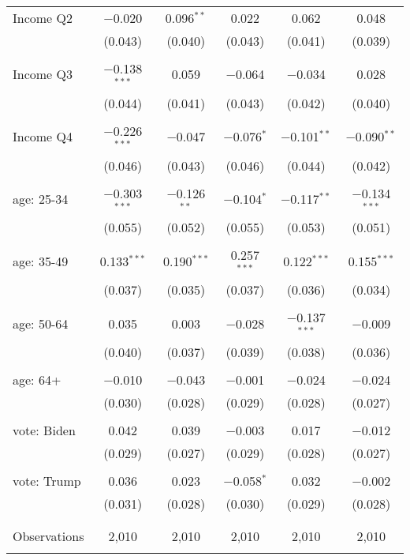 \begin{tabular}{@{\extracolsep{5pt}}lccccc}
 Income Q2 & $-$0.020 & 0.096$^{**}$ & 0.022 & 0.062 & 0.048 \\ 
  & (0.043) & (0.040) & (0.043) & (0.041) & (0.039) \\ 
  & & & & & \\ 
 Income Q3 & $-$0.138$^{***}$ & 0.059 & $-$0.064 & $-$0.034 & 0.028 \\ 
  & (0.044) & (0.041) & (0.043) & (0.042) & (0.040) \\ 
  & & & & & \\ 
 Income Q4 & $-$0.226$^{***}$ & $-$0.047 & $-$0.076$^{*}$ & $-$0.101$^{**}$ & $-$0.090$^{**}$ \\ 
  & (0.046) & (0.043) & (0.046) & (0.044) & (0.042) \\ 
  & & & & & \\ 
 age: 25-34 & $-$0.303$^{***}$ & $-$0.126$^{**}$ & $-$0.104$^{*}$ & $-$0.117$^{**}$ & $-$0.134$^{***}$ \\ 
  & (0.055) & (0.052) & (0.055) & (0.053) & (0.051) \\ 
  & & & & & \\ 
 age: 35-49 & 0.133$^{***}$ & 0.190$^{***}$ & 0.257$^{***}$ & 0.122$^{***}$ & 0.155$^{***}$ \\ 
  & (0.037) & (0.035) & (0.037) & (0.036) & (0.034) \\ 
  & & & & & \\ 
 age: 50-64 & 0.035 & 0.003 & $-$0.028 & $-$0.137$^{***}$ & $-$0.009 \\ 
  & (0.040) & (0.037) & (0.039) & (0.038) & (0.036) \\ 
  & & & & & \\ 
 age: 64+ & $-$0.010 & $-$0.043 & $-$0.001 & $-$0.024 & $-$0.024 \\ 
  & (0.030) & (0.028) & (0.029) & (0.028) & (0.027) \\ 
  & & & & & \\ 
 vote: Biden & 0.042 & 0.039 & $-$0.003 & 0.017 & $-$0.012 \\ 
  & (0.029) & (0.027) & (0.029) & (0.028) & (0.027) \\ 
  & & & & & \\ 
 vote: Trump & 0.036 & 0.023 & $-$0.058$^{*}$ & 0.032 & $-$0.002 \\ 
  & (0.031) & (0.028) & (0.030) & (0.029) & (0.028) \\ 
  & & & & & \\ 
\hline \\[-1.8ex] 

Observations & 2,010 & 2,010 & 2,010 & 2,010 & 2,010 \\ 
\hline 
\hline \\[-1.8ex] 
\end{tabular} 